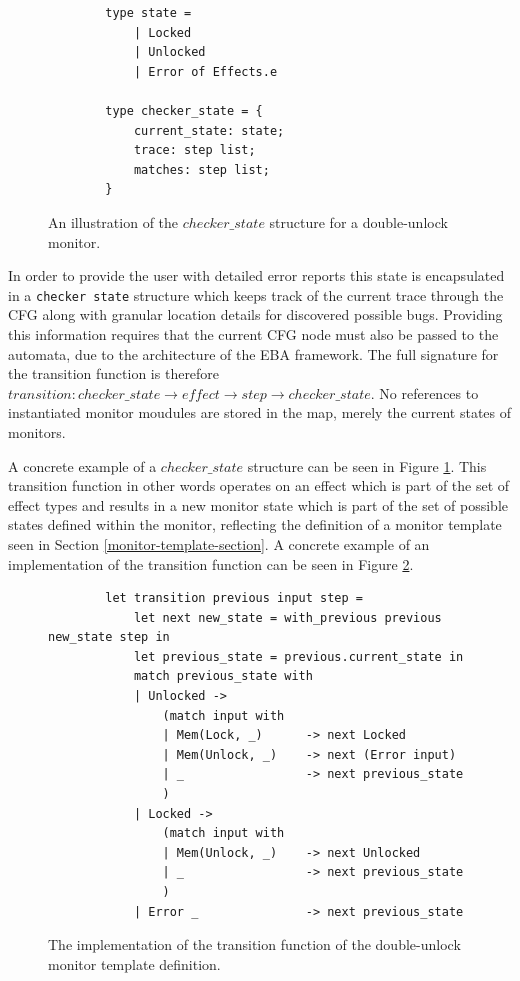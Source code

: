 \begin{figure}[H]
    \centering
    \begin{verbatim}
        type state = 
            | Locked
            | Unlocked
            | Error of Effects.e
    
        type checker_state = {
            current_state: state;
            trace: step list;
            matches: step list;
        }
    \end{verbatim}
    \caption{An illustration of the $checker\_state$ structure for a double-unlock monitor.}
    \label{checker-state}
\end{figure}

\newpar In order to provide the user with detailed error reports this state is encapsulated in a \texttt{checker state} structure which keeps track of the current trace through the CFG along with granular location details for discovered possible bugs. Providing this information requires that the current CFG node must also be passed to the automata, due to the architecture of the EBA framework. The full signature for the transition function is therefore $transition: \mathit{checker\_state} \rightarrow \mathit{effect} \rightarrow \mathit{step} \rightarrow \mathit{checker\_state}$. No references to instantiated monitor moudules are stored in the map, merely the current states of monitors. 

\newpar A concrete example of a $checker\_state$ structure can be seen in Figure \ref{checker-state}. This transition function in other words operates on an effect which is part of the set of effect types and results in a new monitor state which is part of the set of possible states defined within the monitor, reflecting the definition of a monitor template seen in Section \ref{monitor-template-section}. A concrete example of an implementation of the transition function can be seen in Figure \ref{transition-implementation}. 

\begin{figure}[H]
    \centering
    \begin{verbatim}
        let transition previous input step = 
            let next new_state = with_previous previous new_state step in
            let previous_state = previous.current_state in 
            match previous_state with 
            | Unlocked ->
                (match input with 
                | Mem(Lock, _)      -> next Locked
                | Mem(Unlock, _)    -> next (Error input)
                | _                 -> next previous_state
                )
            | Locked ->
                (match input with 
                | Mem(Unlock, _)    -> next Unlocked
                | _                 -> next previous_state
                )
            | Error _               -> next previous_state
    \end{verbatim}
    \caption{The implementation of the transition function of the double-unlock monitor template definition.}
    \label{transition-implementation}
\end{figure}

